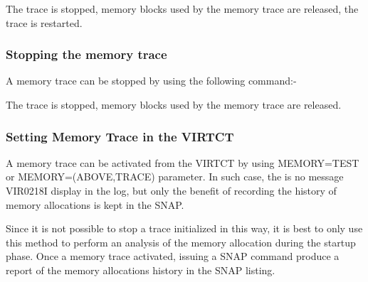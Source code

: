 \documentclass[letterpaper,10pt,english]{sphinxmanual}
\begin{document}
The trace is stopped, memory blocks used by the memory trace are released, the trace is restarted.

\begin{sphinxVerbatim}[commandchars=\\\{\}]
 
          
   
   
   
          
\end{sphinxVerbatim}


\subsubsection{Stopping the memory trace}
\label{\detokenize{audit_operations_ and_performance:stopping-the-memory-trace}}
A memory trace can be stopped by using the following command:-

\begin{sphinxVerbatim}[commandchars=\\\{\}]
\end{sphinxVerbatim}

The trace is stopped, memory blocks used by the memory trace are released.


\subsubsection{Setting Memory Trace in the VIRTCT}
\label{\detokenize{audit_operations_ and_performance:setting-memory-trace-in-the-virtct}}
A memory trace can be activated from the VIRTCT by using MEMORY=TEST or MEMORY=(ABOVE,TRACE) parameter. In such case, the is no message VIR0218I display in the log, but only the benefit of recording the history of memory allocations is kept in the SNAP.

Since it is not possible to stop a trace initialized in this way, it is best to only use this method to perform an analysis of the memory allocation during the startup phase.
Once a memory trace activated, issuing a SNAP command produce a report of the memory allocations history in the SNAP listing.
\end{document}
